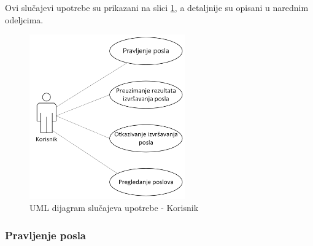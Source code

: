\documentclass[12pt,oneside]{memoir}
\begin{document}
Ovi slučajevi upotrebe su prikazani na slici \ref{fig:slucajupotrebe_korisnik}, a detaljnije su opisani u narednim odeljcima.

\begin{figure}[!ht]
  \centering
  \includegraphics[width=0.6\textwidth]{./images/dijagram_slucajeva_upotrebe_korisnik.png}
  \caption{UML dijagram slučajeva upotrebe - Korisnik}
  \label{fig:slucajupotrebe_korisnik}
\end{figure}

\subsubsection{Pravljenje posla}
\end{document}
